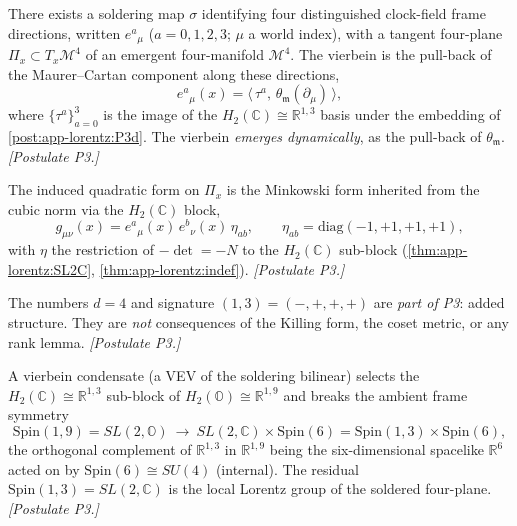 \begin{postulate}
\label{post:app-lorentz:P3a}
There exists a soldering map $\sigma$ identifying four distinguished clock-field
frame directions, written $e^{a}{}_{\mu}$ ($a=0,1,2,3$; $\mu$ a world index), with a
tangent four-plane $\Pi_{x}\subset T_{x}\mathcal{M}^{4}$ of an emergent four-manifold
$\mathcal{M}^{4}$. The vierbein is the pull-back of the Maurer--Cartan component
along these directions,
\begin{equation}
\label{eq:app-lorentz:vierbein}
e^{a}{}_{\mu}(x)=\big\langle\,\tau^{a},\,\theta_{\mathfrak{m}}(\partial_{\mu})\,\big\rangle,
\end{equation}
where $\{\tau^{a}\}_{a=0}^{3}$ is the image of the $H_{2}(\mathbb{C})\cong\mathbb{R}^{1,3}$
basis under the embedding of \autoref{post:app-lorentz:P3d}. The vierbein
\emph{emerges dynamically}, as the pull-back of $\theta_{\mathfrak{m}}$. \emph{[Postulate P3.]}
\end{postulate}

\begin{postulate}
\label{post:app-lorentz:P3b}
The induced quadratic form on $\Pi_{x}$ is the Minkowski form inherited from the
cubic norm via the $H_{2}(\mathbb{C})$ block,
\begin{equation}
\label{eq:app-lorentz:metric}
g_{\mu\nu}(x)=e^{a}{}_{\mu}(x)\,e^{b}{}_{\nu}(x)\,\eta_{ab},
\qquad \eta_{ab}=\mathrm{diag}(-1,+1,+1,+1),
\end{equation}
with $\eta$ the restriction of $-\det=-N$ to the $H_{2}(\mathbb{C})$ sub-block
(\autoref{thm:app-lorentz:SL2C}, \autoref{thm:app-lorentz:indef}). \emph{[Postulate P3.]}
\end{postulate}

\begin{postulate}
\label{post:app-lorentz:P3c}
The numbers $d=4$ and signature $(1,3)=(-,+,+,+)$ are \emph{part of P3}: added
structure. They are \emph{not} consequences of the Killing form, the coset metric, or
any rank lemma. \emph{[Postulate P3.]}
\end{postulate}

\begin{postulate}
\label{post:app-lorentz:P3d}
A vierbein condensate (a VEV of the soldering bilinear) selects the
$H_{2}(\mathbb{C})\cong\mathbb{R}^{1,3}$ sub-block of
$H_{2}(\mathbb{O})\cong\mathbb{R}^{1,9}$ and breaks the ambient frame symmetry
\begin{equation}
\label{eq:app-lorentz:reduction}
\mathrm{Spin}(1,9)=SL(2,\mathbb{O})\ \longrightarrow\
SL(2,\mathbb{C})\times \mathrm{Spin}(6)=\mathrm{Spin}(1,3)\times\mathrm{Spin}(6),
\end{equation}
the orthogonal complement of $\mathbb{R}^{1,3}$ in $\mathbb{R}^{1,9}$ being the
six-dimensional spacelike $\mathbb{R}^{6}$ acted on by $\mathrm{Spin}(6)\cong SU(4)$
(internal). The residual $\mathrm{Spin}(1,3)=SL(2,\mathbb{C})$ is the local Lorentz
group of the soldered four-plane. \emph{[Postulate P3.]}
\end{postulate}

